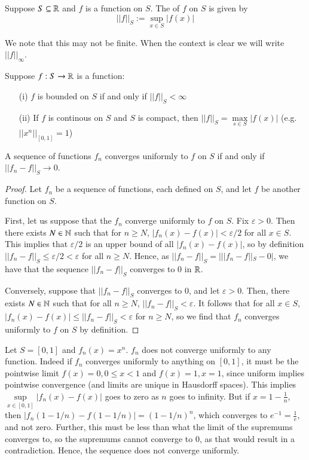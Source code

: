\begin{defn}
    Suppose $S \subseteq \mathbb R$ and $f$ is a function on $S$. The  of $f$ on $S$ is given by \begin{equation*}
        ||f||_S := \sup\limits_{x\in S}|f(x)|
    \end{equation*}
\end{defn}
We note that this may not be finite. When the context is clear we will write $||f||_{\infty}$. 

\begin{rmk}
    Suppose $f:S\rightarrow \mathbb R$ is a function: \begin{enumerate}
        \item[(i)] $f$ is bounded on $S$ if and only if $||f||_S < \infty$
        \item[(ii)] If $f$ is continous on $S$ and $S$ is compact, then $||f||_S = \max\limits_{s \in S}|f(x)|$ (e.g. $||x^n||_{[0,1]} = 1$)
    \end{enumerate}
\end{rmk}


\begin{prop}
    A sequence of functions $f_n$ converges uniformly to $f$ on $S$ if and only if $||f_n-f||_S\rightarrow 0$.
\end{prop}
\begin{proof}
    Let $f_n$ be a sequence of functions, each defined on $S$, and let $f$ be another function on $S$.

    First, let us suppose that the $f_n$ converge uniformly to $f$ on $S$. Fix $\varepsilon > 0$. Then there exists $N \in \mathbb N$ such that for $n \geq N$, $|f_n(x) - f(x)| < \varepsilon/2$ for all $x \in S$. This implies that $\varepsilon/2$ is an upper bound of all $|f_n(x)-f(x)|$, so by definition $||f_n-f||_S \leq \varepsilon/2 < \varepsilon$ for all $n \geq N$. Hence, as $||f_n-f||_S = |||f_n -f||_S - 0|$, we have that the sequence $||f_n-f||_S$ converges to $0$ in $\mathbb R$.

    Conversely, suppose that $||f_n-f||_S$ converges to $0$, and let $\varepsilon > 0$. Then, there exists $N \in \mathbb N$ such that for all $n \geq N$, $||f_n-f||_S < \varepsilon$. It follows that for all $x \in S$, $|f_n(x) - f(x)| \leq ||f_n-f||_S < \varepsilon$ for $n \geq N$, so we find that $f_n$ converges uniformly to $f$ on $S$ by definition.
\end{proof}

\begin{eg}
    Let $S = [0,1]$ and $f_n(x) = x^n$. $f_n$ does not converge uniformly to any function. Indeed if $f_n$ converges uniformly to anything on $[0,1]$, it must be the pointwise limit $f(x) = 0, 0 \leq x < 1$ and $f(x) = 1, x =1$, since uniform implies pointwise convergence (and limits are unique in Hausdorff spaces). This implies $\sup\limits_{x \in [0,1]}|f_n(x) - f(x)|$ goes to zero as $n$ goes to infinity. But if $x = 1-\frac{1}{n}$, then $|f_n(1-1/n)-f(1-1/n)| = (1-1/n)^n$, which converges to $e^{-1} = \frac{1}{e}$, and not zero. Further, this must be less than what the limit of the supremums converges to, so the supremums cannot converge to $0$, as that would result in a contradiction. Hence, the sequence does not converge uniformly.
\end{eg}

